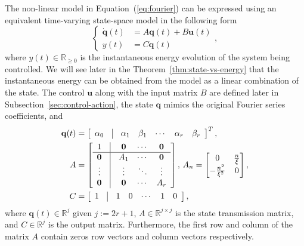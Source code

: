 \documentclass[letterpaper,10pt,conference]{ieeeconf}
\begin{document}
The non-linear model in Equation~(\ref{eq:fourier}) can be expressed using an equivalent time-varying state-space model in the following form
\begin{equation}\label{eq:state-perf}\begin{cases}
  \dot{\mathbf{q}}(t)&=A\mathbf{q}(t)+B\mathbf{u}(t)\\%
  y(t)&=C\mathbf{q}(t)%
\end{cases},\end{equation}
where $y(t)\in\mathbb{R}_{\geq 0}$ is the instantaneous energy evolution of the system being controlled. We will see later in the Theorem~\ref{thm:state-vs-energy} that the instantaneous energy can be obtained from the model as a linear combination of the state. The control $\mathbf{u}$ along with the input matrix $B$ are defined later in Subsection~\ref{sec:control-action}, the state $\mathbf{q}$ mimics the original Fourier series coefficients, and
\begin{equation}\label{eq:state-details}\begin{split}
  \mathbf{q}(t)&=\left[\begin{array}{ccccccc}
    \alpha_0 & \vline & \alpha_1 & \beta_1 & \cdots & \alpha_r & \beta_r
  \end{array}\right]^T,\\
  A&=\left[\begin{array}{ccccc}
    1          & \vline & \mathbf{0} & \cdots & \mathbf{0} \\\hline
    \mathbf{0} & \vline & A_1        & \cdots & \mathbf{0} \\
    \vdots     & \vline & \vdots     & \ddots & \vdots     \\
    \mathbf{0} & \vline & \mathbf{0} & \cdots & A_r 
  \end{array}\right],\,A_n=\begin{bmatrix}0 & \frac{n}{\xi} \\ -\frac{n^2}{\xi^2} & 0\end{bmatrix},\\
  C&=\left[\begin{array}{ccccccc}
    1 & \vline & 1 & 0 & \cdots & 1 & 0
  \end{array}\right],
\end{split}\end{equation}
where $\mathbf{q}(t)\in\mathbb{R}^j$ given $j:=2r+1$, $A\in\mathbb{R}^{j\times j}$ is the state transmission matrix, and $C\in\mathbb{R}^j$ is the output matrix. Furthermore, the first row and column of the matrix $A$ contain zeros row vectors and column vectors respectively.
\end{document}
